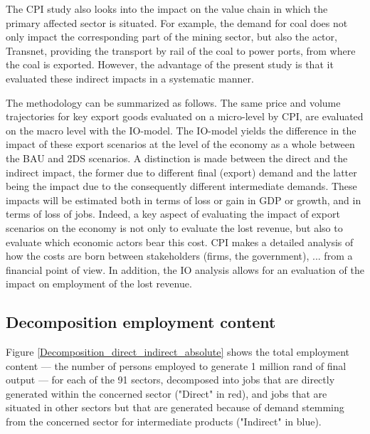 \documentclass[12pt,english]{article}
\begin{document}
The CPI study also looks into the impact on the value chain in which the primary affected sector is situated. For example, the demand for coal does not only impact the corresponding part of the mining sector, but also the actor, Transnet, providing the transport by rail of the coal to power ports, from where the coal is exported. However, the advantage of the present study is that it evaluated these indirect impacts in a systematic manner.

The methodology can be summarized as follows. The same price and volume trajectories for key export goods %
evaluated on a micro-level by CPI, are evaluated on the macro level with the IO-model. The IO-model yields the difference in the impact of these export scenarios at the level of the economy as a whole between the BAU and 2DS scenarios. A distinction is made between the direct and the indirect impact, the former due to different final (export) demand and the latter being the impact due to the consequently different intermediate demands. These impacts will be estimated both in terms of loss or gain in GDP or growth, and in terms of loss of jobs. Indeed, a key aspect of evaluating the impact of export scenarios on the economy is not only to evaluate the lost revenue, but also to evaluate which economic actors bear this cost. CPI makes a detailed analysis of how the costs are born between stakeholders (firms, the government), ... from a financial point of view. In addition, the IO analysis allows for an evaluation of the impact on employment of the lost revenue. 






\subsection{Decomposition employment content}
Figure \ref{Decomposition_direct_indirect_absolute} shows the total employment content --- the number of persons employed to generate 1 million rand of final output --- for each of the 91 sectors, decomposed into jobs that are directly generated within the concerned sector ("Direct" in red), and jobs that are situated in other sectors but that are generated because of demand stemming from the concerned sector for intermediate products ("Indirect" in blue).
\end{document}
